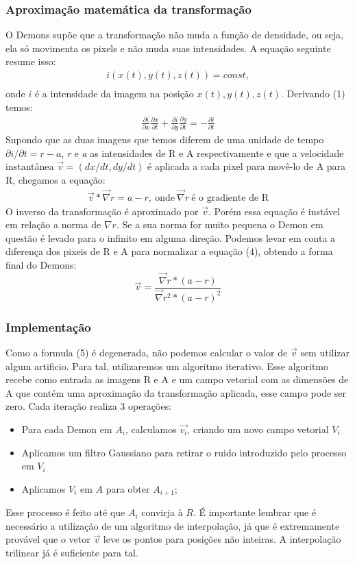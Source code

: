 \documentclass[]{spie}  %
\begin{document}
\subsubsection{Aproximação matemática da transformação}
	O Demons supõe que a transformação não muda a função de densidade, ou seja, ela só movimenta os pixels e não muda
suas intensidades. A equação seguinte resume isso:
\begin{align}
	i(x(t),y(t),z(t)) = const, \\
\end{align}
	onde $i$ é a intensidade da imagem na posição $x(t),y(t),z(t)$. Derivando (1) temos:
\begin{align}
	\frac{\partial i}{\partial x} \frac{\partial x}{\partial t} +
	\frac{\partial i}{\partial y} \frac{\partial y}{\partial t} = - \frac{\partial i}{\partial t}
\end{align}
	Supondo que as duas imagens que temos diferem de uma unidade de tempo $\partial i/\partial t = 
r-a$, \textit{r} e \textit{a} as intensidades de R e A respectivamente e que a velocidade instantânea $\vec{v} = (dx/dt,dy/dt)$ é aplicada a cada pixel para movê-lo de A para R, 
chegamos a equação:
\begin{align}
	\vec{v}*\vec{\nabla}r = a - r, \ \text{onde} \ \vec{\nabla} r \ \text{é o gradiente de R}
\end{align}
	O inverso da transformação é aproximado por $\vec{v}$. Porém essa equação é instável em relação a norma de $\nabla 
r$. Se a sua norma for muito pequena o Demon em questão é levado para o infinito em alguma direção. Podemos levar em 
conta a diferença dos pixeis de R e A para normalizar a equação (4), obtendo a forma final do Demons:
\begin{equation}
	\vec{v} = \frac{\vec{\nabla}r * (a - r)}{\vec{\nabla}r^2 * (a - r)^2}
\end{equation}

\subsubsection{Implementação}
	Como a formula (5) é degenerada, não podemos calcular o valor de $\vec{v}$ sem utilizar algum artificio. Para tal,
utilizaremos um algoritmo iterativo. Esse algoritmo recebe como entrada as imagens R e A e um campo vetorial
com as dimensões de A que contém uma aproximação da transformação aplicada, esse campo pode ser zero. 
Cada iteração realiza 3 operações:
\begin{itemize}
	\item Para cada Demon em $A_i$, calculamos $\vec{v_i}$, criando um novo campo vetorial $V_i$
	\item Aplicamos um filtro Gaussiano para retirar o ruido introduzido pelo processo em $V_i$
	\item Aplicamos $V_i$ em $A$ para obter $A_{i+1}$;
\end{itemize}
	Esse processo é feito até que $A_i$ convirja à $R$. É importante lembrar que é necessário a
utilização de um algoritmo de interpolação, já que é extremamente provável que o vetor $\vec{v}$
leve os pontos para posições não inteiras. A interpolação trilinear já é suficiente para tal.
\end{document}
